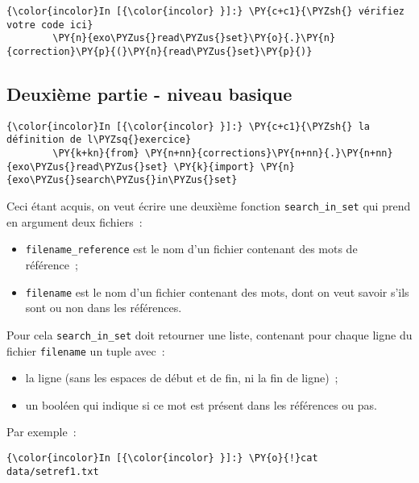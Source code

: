     \begin{Verbatim}[commandchars=\\\{\}]
{\color{incolor}In [{\color{incolor} }]:} \PY{c+c1}{\PYZsh{} vérifiez votre code ici}
        \PY{n}{exo\PYZus{}read\PYZus{}set}\PY{o}{.}\PY{n}{correction}\PY{p}{(}\PY{n}{read\PYZus{}set}\PY{p}{)}
\end{Verbatim}


    \hypertarget{deuxiuxe8me-partie---niveau-basique}{%
\subsection{Deuxième partie - niveau
basique}\label{deuxiuxe8me-partie---niveau-basique}}

    \begin{Verbatim}[commandchars=\\\{\}]
{\color{incolor}In [{\color{incolor} }]:} \PY{c+c1}{\PYZsh{} la définition de l\PYZsq{}exercice}
        \PY{k+kn}{from} \PY{n+nn}{corrections}\PY{n+nn}{.}\PY{n+nn}{exo\PYZus{}read\PYZus{}set} \PY{k}{import} \PY{n}{exo\PYZus{}search\PYZus{}in\PYZus{}set}
\end{Verbatim}


    Ceci étant acquis, on veut écrire une deuxième fonction
\texttt{search\_in\_set} qui prend en argument deux fichiers~:

\begin{itemize}
\tightlist
\item
  \texttt{filename\_reference} est le nom d'un fichier contenant des
  mots de référence~;
\item
  \texttt{filename} est le nom d'un fichier contenant des mots, dont on
  veut savoir s'ils sont ou non dans les références.
\end{itemize}

Pour cela \texttt{search\_in\_set} doit retourner une liste, contenant
pour chaque ligne du fichier \texttt{filename} un tuple avec~:

\begin{itemize}
\tightlist
\item
  la ligne (sans les espaces de début et de fin, ni la fin de ligne)~;
\item
  un booléen qui indique si ce mot est présent dans les références ou
  pas.
\end{itemize}

Par exemple~:

    \begin{Verbatim}[commandchars=\\\{\}]
{\color{incolor}In [{\color{incolor} }]:} \PY{o}{!}cat data/setref1.txt
\end{Verbatim}


